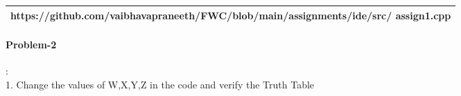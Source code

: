 \documentclass[10pt, a4paper]{article}
\begin{document}
   \begin{tabularx}{0.70\textwidth} { 
  | >{\centering\arraybackslash}X |}
  \hline
  https://github.com/vaibhavapraneeth/FWC/blob/main/assignments/ide/src/   assign1.cpp\\
  \hline
\end{tabularx}

   \paragraph{Problem-2}:\\
1. Change the values of W,X,Y,Z in the code and verify the Truth Table\\



\end{document}
